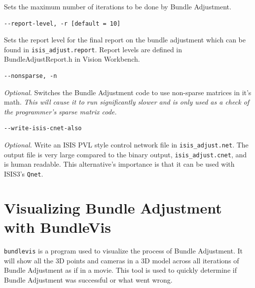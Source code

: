 Sets the maximum number of iterations to be done by Bundle Adjustment.

\begin{verbatim}
--report-level, -r [default = 10]
\end{verbatim}

Sets the report level for the final report on the bundle adjustment
which can be found in \verb=isis_adjust.report=. Report levels are defined in
BundleAdjustReport.h in Vision Workbench.

\begin{verbatim}
--nonsparse, -n
\end{verbatim}

\emph{Optional.} Switches the Bundle Adjustment code to use non-sparse
matrices in it's math. \emph{This will cause it to run significantly slower
and is only used as a check of the programmer's sparse matrix code.}

\begin{verbatim}
--write-isis-cnet-also
\end{verbatim}

\emph{Optional.} Write an ISIS PVL style control network file in
\verb=isis_adjust.net=. The output file is very large compared to the
binary output, \verb=isis_adjust.cnet=, and is human readable. This
alternative's importance is that it can be used with ISIS3's
\texttt{Qnet}.

\section{Visualizing Bundle Adjustment with BundleVis}

\texttt{bundlevis} is a program used to visualize the process of
Bundle Adjustment. It will show all the 3D points and cameras in a 3D
model across all iterations of Bundle Adjustment as if in a
movie. This tool is used to quickly determine if Bundle Adjustment was
successful or what went wrong.

